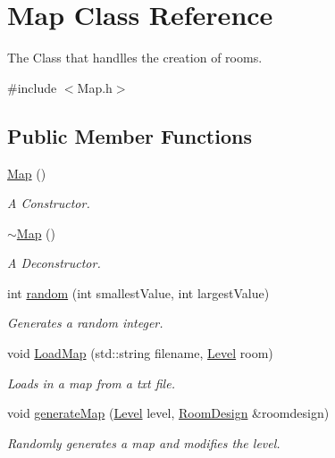 \hypertarget{class_map}{}\section{Map Class Reference}
\label{class_map}


The Class that handlles the creation of rooms.  




{\ttfamily \#include $<$Map.\+h$>$}

\subsection*{Public Member Functions}
\begin{DoxyCompactItemize}
\item 
\mbox{\label{class_map_a0f5ad0fd4563497b4214038cbca8b582}} 
\hyperlink{class_map_a0f5ad0fd4563497b4214038cbca8b582}{Map} ()
\begin{DoxyCompactList}\small\item\em A Constructor. \end{DoxyCompactList}\item 
\mbox{\label{class_map_aa403fbe09394ccf39747588f5168e3b2}} 
\hyperlink{class_map_aa403fbe09394ccf39747588f5168e3b2}{$\sim$\+Map} ()
\begin{DoxyCompactList}\small\item\em A Deconstructor. \end{DoxyCompactList}\item 
\mbox{\label{class_map_a10bafffa9cb710fbd0c134c349e0f24f}} 
int \hyperlink{class_map_a10bafffa9cb710fbd0c134c349e0f24f}{random} (int smallest\+Value, int largest\+Value)
\begin{DoxyCompactList}\small\item\em Generates a random integer. \end{DoxyCompactList}\item 
\mbox{\label{class_map_a6837111691935c0cafaad3adfa726be8}} 
void \hyperlink{class_map_a6837111691935c0cafaad3adfa726be8}{Load\+Map} (std\+::string filename, \hyperlink{class_level}{Level} room)
\begin{DoxyCompactList}\small\item\em Loads in a map from a txt file. \end{DoxyCompactList}\item 
\mbox{\label{class_map_ac1ffbdcddb96eb103cd9d9947105dda3}} 
void \hyperlink{class_map_ac1ffbdcddb96eb103cd9d9947105dda3}{generate\+Map} (\hyperlink{class_level}{Level} level, \hyperlink{class_room_design}{Room\+Design} \&roomdesign)
\begin{DoxyCompactList}\small\item\em Randomly generates a map and modifies the level. \end{DoxyCompactList}\end{DoxyCompactItemize}


